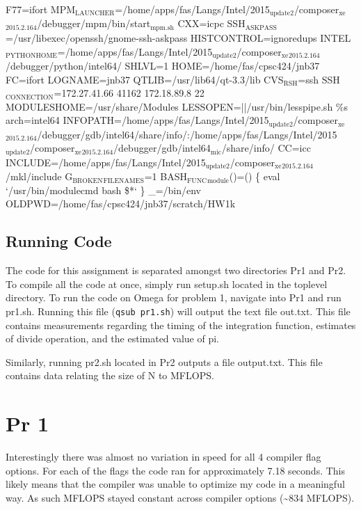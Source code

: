 \documentclass[11pt]{article}
\begin{document}
F77=ifort
MPM\(_{\text{LAUNCHER}}\)=/home/apps/fas/Langs/Intel/2015\(_{\text{update2}}\)/composer\(_{\text{xe}}\)\(_{\text{2015.2.164}}\)/debugger/mpm/bin/start\(_{\text{mpm.sh}}\)
CXX=icpc
SSH\(_{\text{ASKPASS}}\)=/usr/libexec/openssh/gnome-ssh-askpass
HISTCONTROL=ignoredups
INTEL\(_{\text{PYTHONHOME}}\)=/home/apps/fas/Langs/Intel/2015\(_{\text{update2}}\)/composer\(_{\text{xe}}\)\(_{\text{2015.2.164}}\)/debugger/python/intel64/
SHLVL=1
HOME=/home/fas/cpsc424/jnb37
FC=ifort
LOGNAME=jnb37
QTLIB=/usr/lib64/qt-3.3/lib
CVS\(_{\text{RSH}}\)=ssh
SSH\(_{\text{CONNECTION}}\)=172.27.41.66 41162 172.18.89.8 22
MODULESHOME=/usr/share/Modules
LESSOPEN=||/usr/bin/lesspipe.sh \%s
arch=intel64
INFOPATH=/home/apps/fas/Langs/Intel/2015\(_{\text{update2}}\)/composer\(_{\text{xe}}\)\(_{\text{2015.2.164}}\)/debugger/gdb/intel64/share/info/:/home/apps/fas/Langs/Intel/2015\(_{\text{update2}}\)/composer\(_{\text{xe}}\)\(_{\text{2015.2.164}}\)/debugger/gdb/intel64\(_{\text{mic}}\)/share/info/
CC=icc
INCLUDE=/home/apps/fas/Langs/Intel/2015\(_{\text{update2}}\)/composer\(_{\text{xe}}\)\(_{\text{2015.2.164}}\)/mkl/include
G\(_{\text{BROKEN}}\)\(_{\text{FILENAMES}}\)=1
BASH\(_{\text{FUNC}}\)\(_{\text{module}}\)()=() \{  eval `/usr/bin/modulecmd bash \$*`
\}
\_=/bin/env
OLDPWD=/home/fas/cpsc424/jnb37/scratch/HW1k


\subsection{Running Code}
\label{sec:orga816925}

The code for this assignment is separated amongst two directories Pr1 and Pr2. To compile all the code at once, simply run setup.sh located in the toplevel directory. To run the code on Omega for problem 1, navigate into Pr1 and run pr1.sh. Running this file (\texttt{qsub pr1.sh}) will output the text file out.txt. This file contains measurements regarding the timing of the integration function, estimates of divide operation, and the estimated value of pi.

Similarly, running pr2.sh located in Pr2 outputs a file output.txt. This file contains data relating the size of N to MFLOPS.

\section{Pr 1}
\label{sec:orgf11d705}

Interestingly there was almost no variation in speed for all 4 compiler flag options. For each of the flags the code ran for approximately 7.18 seconds. This likely means that the compiler was unable to optimize my code in a meaningful way. As such MFLOPS stayed constant across compiler options (\textasciitilde{}834 MFLOPS). 
\end{document}
